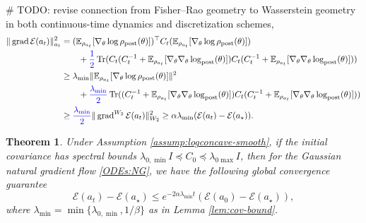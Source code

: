 \documentclass[11pt]{article}
\theoremstyle{plain}
\newtheorem{theorem}{Theorem}[section]
\theoremstyle{definition}
\theoremstyle{remark}
\newcommand{\E}{\mathbb{E}}
\newcommand{\Tr}{\operatorname{Tr}}
\newcommand{\post}{\mathrm{post}}
\newcommand{\grad}{\operatorname{grad}}
\begin{document}
\begin{tcolorbox}[colback=white, colframe=black, coltext=red]
\# TODO: revise connection from Fisher--Rao geometry to Wasserstein geometry in both continuous-time dynamics and discretization schemes,
\begin{align*}
    \| \grad \mathcal{E} (a_t) \|_{a_t}^2 &=  (\E_{\rho_{a_t}} [\nabla_\theta \log \rho_\post (\theta)])^\top C_t (\E_{\rho_{a_t}} [\nabla_\theta \log \rho_\post (\theta)]) \\
    &\qquad + \textcolor{blue}{\frac12} \Tr (C_t (C_t^{-1} + \E_{\rho_{a_t}} [\nabla_\theta \nabla_\theta \log_\post (\theta)]) C_t (C_t^{-1} + \E_{\rho_{a_t}} [\nabla_\theta \nabla_\theta \log_\post (\theta)])) \\
    &\geq \lambda_{\min} \| \E_{\rho_{a_t}} [\nabla_\theta \log \rho_\post (\theta)] \|^2 \\
    &\qquad + \textcolor{blue}{\frac{\lambda_{\min}}{2}} \Tr ((C_t^{-1} + \E_{\rho_{a_t}} [\nabla_\theta \nabla_\theta \log_\post (\theta)]) C_t (C_t^{-1} + \E_{\rho_{a_t}} [\nabla_\theta \nabla_\theta \log_\post (\theta)])) \\
    &\geq \textcolor{blue}{\frac{\lambda_{\min}}{2}} \| \grad^{W_2} \mathcal{E} (a_t) \|_{W_2}^2 \geq \alpha\lambda_{\min} (\mathcal{E} (a_t) - \mathcal{E} (a_\star)).
\end{align*}
\end{tcolorbox}

\begin{theorem}\label{thm:glob-conv}
    Under Assumption \ref{assump:logconcave-smooth}, if the initial covariance has spectral bounds $\lambda_{0, \min} I \preceq C_0 \preceq \lambda_{0\max} I$, then for the Gaussian natural gradient flow \eqref{ODEs:NG}, we have the following global convergence guarantee
    \begin{equation*}
        \mathcal{E}(a_t) - \mathcal{E} (a_\star) \leq e^{-2\alpha \lambda_{\min} t} (\mathcal{E} (a_0) - \mathcal{E} (a_\star)),
    \end{equation*}
    where $\lambda_{\min} = \min \{ \lambda_{0, \min}, 1/\beta\}$ as in Lemma \ref{lem:cov-bound}.
\end{theorem}
\end{document}
